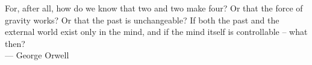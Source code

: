 
\cleardoublepage
{}
\thispagestyle{empty}

\vspace*{3cm}

\begin{center}
    For, after all, how do we know that two and two make four? Or that the force of gravity works? Or that the past is unchangeable? If both
the past and the external world exist only in the mind, and if the mind itself is controllable – what then? \\ \medskip 
--- George Orwell    
\end{center}


